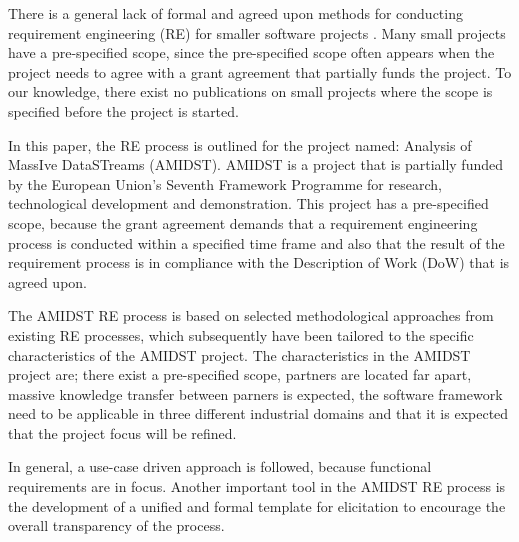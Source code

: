 There is a general lack of formal and agreed upon methods for conducting requirement engineering (RE) for smaller software projects \cite{Ara07,Qui10}.  Many small projects have a pre-specified scope, since the pre-specified scope often appears when the project needs to agree with a grant agreement that partially funds the project.  To our knowledge, there exist no publications on small projects where the scope is specified before the project is started.  

In this paper, the RE process is outlined for the project named: Analysis of MassIve DataSTreams (AMIDST).  AMIDST is a project that is partially funded by the European Union's Seventh Framework Programme for research, technological development and demonstration.  This project has a pre-specified scope, because the grant agreement demands that a requirement engineering process is conducted within a specified time frame and also that the result of the requirement process is in compliance with the Description of Work (DoW) that is agreed upon.   

The AMIDST RE process is based on selected methodological approaches from existing RE processes, which subsequently have been tailored to the specific characteristics of the AMIDST project.  The characteristics in the AMIDST project are; there exist a pre-specified scope, partners are located far apart, massive knowledge transfer between parners is expected, the software framework need to be applicable in three different industrial domains and that it is expected that the project focus will be refined.  

In general, a use-case driven approach is followed, because functional requirements are in focus. Another important tool in the AMIDST RE process is the development of a unified and formal template for elicitation to encourage the overall transparency of the process.